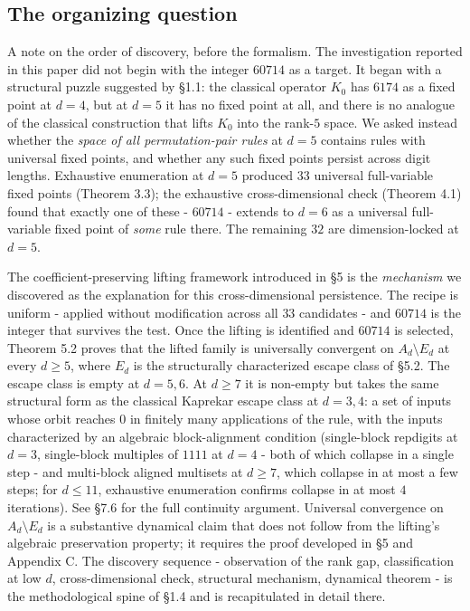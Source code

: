 \documentclass[11pt,letterpaper]{article}
\theoremstyle{paperstyle}
\theoremstyle{paperstyledef}
\theoremstyle{paperstylerem}
\begin{document}
\hypertarget{the-organizing-question}{%
\subsection{The organizing question}\label{the-organizing-question}}

A note on the order of discovery, before the formalism. The
investigation reported in this paper did not begin with the integer
\(60714\) as a target. It began with a structural puzzle suggested by
§1.1: the classical operator \(K_0\) has \(6174\) as a fixed point at
\(d = 4\), but at \(d = 5\) it has no fixed point at all, and there is
no analogue of the classical construction that lifts \(K_0\) into the
rank-\(5\) space. We asked instead whether the \emph{space of all
permutation-pair rules} at \(d = 5\) contains rules with universal fixed
points, and whether any such fixed points persist across digit lengths.
Exhaustive enumeration at \(d = 5\) produced \(33\) universal
full-variable fixed points (Theorem 3.3); the exhaustive
cross-dimensional check (Theorem 4.1) found that exactly one of these - \(60714\) - extends to \(d = 6\) as a universal full-variable
fixed point of \emph{some} rule there. The remaining \(32\) are
dimension-locked at \(d = 5\).

The coefficient-preserving lifting framework introduced in §5 is the
\emph{mechanism} we discovered as the explanation for this
cross-dimensional persistence. The recipe is uniform - applied without
modification across all \(33\) candidates - and \(60714\) is the
integer that survives the test. Once the lifting is identified and
\(60714\) is selected, Theorem 5.2 proves that the lifted family is
universally convergent on \(A_d \setminus E_d\) at every \(d \geq 5\),
where \(E_d\) is the structurally characterized escape class of §5.2.
The escape class is empty at \(d = 5, 6\). At \(d \geq 7\) it is
non-empty but takes the same structural form as the classical Kaprekar
escape class at \(d = 3, 4\): a set of inputs whose orbit reaches \(0\)
in finitely many applications of the rule, with the inputs characterized
by an algebraic block-alignment condition (single-block repdigits at
\(d = 3\), single-block multiples of \(1111\) at \(d = 4\) - both of
which collapse in a single step - and multi-block aligned multisets at
\(d \geq 7\), which collapse in at most a few steps; for \(d \leq 11\),
exhaustive enumeration confirms collapse in at most \(4\) iterations).
See §7.6 for the full continuity argument. Universal convergence on
\(A_d \setminus E_d\) is a substantive dynamical claim that does not
follow from the lifting's algebraic preservation property; it requires
the proof developed in §5 and Appendix C. The discovery sequence -
observation of the rank gap, classification at low \(d\),
cross-dimensional check, structural mechanism, dynamical theorem - is
the methodological spine of §1.4 and is recapitulated in detail there.
\end{document}
